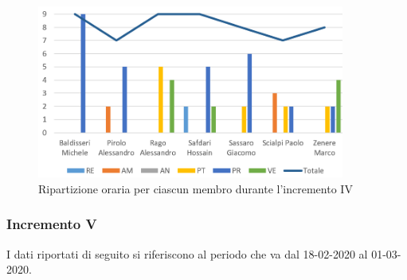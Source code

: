 \begin{figure}[!htb]   
    \centering
    \includegraphics[width=0.9\textwidth]{Images/inc4}
	\caption{Ripartizione oraria per ciascun membro durante l'incremento IV}
\end{figure}

\subsubsection{Incremento V}

I dati riportati di seguito si riferiscono al periodo che va dal 18-02-2020 al 01-03-2020.

